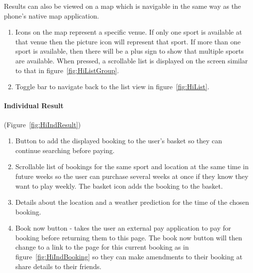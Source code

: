 Results can also be viewed on a map which is navigable in the same
way as the phone's native map application. 
\begin{enumerate}
	\item Icons on the map represent a specific venue. If only one sport is
	      available at that venue then the picture icon will represent that
	      sport. If more than one sport is available, then there will be a plus
	      sign to show that multiple sports are available. When pressed, a scrollable
	      list is displayed on the screen similar to that in figure~\ref{fig:HiListGroup}.
	\item Toggle bar to navigate back to the list view in figure~\ref{fig:HiList}.
\end{enumerate}

\paragraph{Individual Result}

(Figure~\ref{fig:HiIndResult})

\begin{enumerate}
	\item Button to add the displayed booking to the user's basket so they can
	      continue searching before paying.
	\item Scrollable list of bookings for the same sport and location at the
	      same time in future weeks so the user can purchase several weeks at
	      once if they know they want to play weekly. The basket icon adds the
	      booking to the basket.
	\item Details about the location and a weather prediction for the time of
	      the chosen booking.
	\item Book now button - takes the user an external pay application to pay
	      for booking before returning them to this page. The book now button
	      will then change to a link to the page for this current booking as
	      in figure~\ref{fig:HiIndBooking} so they can make amendments to their
	      booking at share details to their friends.
\end{enumerate}



